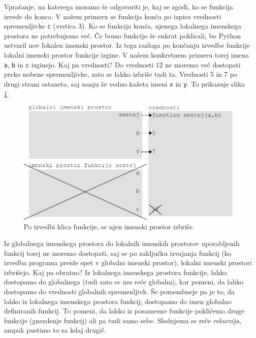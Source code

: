 Vprašanje, na katerega moramo še odgovoriti je, kaj se zgodi, ko se funkcija izvede do konca. V našem primeru se funkcija konča po izpisu vrednosti spremenljivke \texttt{c} (vrstica 3). Ko se funkcija konča, njenega lokalnega imenskega prostora ne potrebujemo več. Če bomo funkcijo še enkrat poklicali, bo Python ustvaril nov lokalen imenski prostor. Iz tega razloga po končanju izvedbe funkcije lokalni imenski prostor funkcije izgine. V našem konkretnem primeru torej imena \texttt{a}, \texttt{b} in \texttt{c} izginejo. Kaj pa vrednosti? Do vrednosti 12 ne moremo več dostopati preko nobene spremenljivke, zato se lahko izbriše tudi ta. Vrednosti 5 in 7 po drugi strani ostaneta, saj nanju še vedno kažeta imeni \texttt{x} in \texttt{y}. To prikazuje slika \ref{img:imenski_prostor_6}.
\begin{figure}
    \centering
    \includegraphics[width=\linewidth]{img/imenski_prostor_6.pdf}
    \caption{Po izvedbi klica funkcije, se njen imenski prostor izbriše.}
    \label{img:imenski_prostor_6}
\end{figure}

Iz globalnega imenskega prostora do lokalnih imenskih prostorov uporabljenih funkcij torej ne moremo dostopati, saj se po zaključku izvajanja funkcij (ko izvedba programa preide spet v globalni imenski prostor), lokalni imenski prostori izbrišejo. Kaj pa obratno? Iz lokalnega imenskega prostora funkcije, lahko dostopamo do globalnega (tudi zato se mu reče globalni), kar pomeni, da lahko dostopamo do vrednosti globalnih spremenljivk. Še pomembneje pa je to, da lahko iz lokalnega imenskega prostora funkcij, dostopamo do imen globalno definiranih funkcij. To pomeni, da lahko iz posamezne funkcije pokličemo druge funkcije (gnezdenje funkcij) ali pa tudi samo sebe. Slednjemu se reče \emph{rekurzija}, ampak pustimo to za kdaj drugič. 

